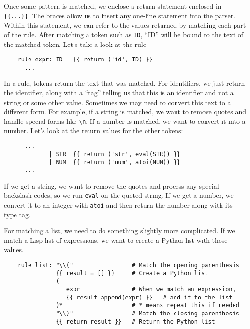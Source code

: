 \documentclass[10pt]{article}
\begin{document}
Once some pattern is matched, we enclose a return statement enclosed
in \verb|{{...}}|.  The braces allow us to insert any one-line
statement into the parser.  Within this statement, we can refer to the
values returned by matching each part of the rule.  After matching a
token such as \texttt{ID}, ``ID'' will be bound to the text of the
matched token.  Let's take a look at the rule:

\begin{verbatim}
    rule expr: ID   {{ return ('id', ID) }}
      ...
\end{verbatim}

In a rule, tokens return the text that was matched.  For identifiers,
we just return the identifier, along with a ``tag'' telling us that
this is an identifier and not a string or some other value.  Sometimes
we may need to convert this text to a different form.  For example, if
a string is matched, we want to remove quotes and handle special forms
like \verb|\n|.  If a number is matched, we want to convert it into a
number.  Let's look at the return values for the other tokens:

\begin{verbatim}
      ...
             | STR  {{ return ('str', eval(STR)) }}
             | NUM  {{ return ('num', atoi(NUM)) }}
      ...
\end{verbatim}

If we get a string, we want to remove the quotes and process any
special backslash codes, so we run \texttt{eval} on the quoted string.
If we get a number, we convert it to an integer with \texttt{atoi} and
then return the number along with its type tag.

For matching a list, we need to do something slightly more
complicated.  If we match a Lisp list of expressions, we want to
create a Python list with those values.

\begin{verbatim}
    rule list: "\\("                 # Match the opening parenthesis
               {{ result = [] }}     # Create a Python list
               ( 
                  expr               # When we match an expression,
                  {{ result.append(expr) }}   # add it to the list
               )*                    # * means repeat this if needed
               "\\)"                 # Match the closing parenthesis
               {{ return result }}   # Return the Python list
\end{verbatim}
\end{document}
